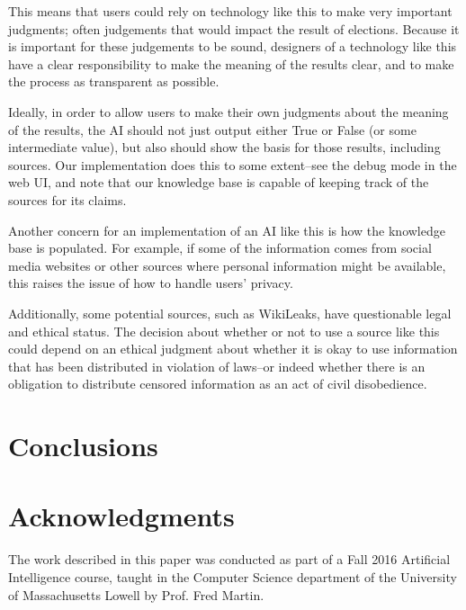 \documentclass{chi2009}
\begin{document}
This means that users could rely on technology like this to make very important judgments; often judgements that would impact the result of elections.
Because it is important for these judgements to be sound, designers of a technology like this have a clear responsibility to make the meaning of the results clear, and to make the process as transparent as possible.

Ideally, in order to allow users to make their own judgments about the meaning of the results, the AI should not just output either True or False (or some intermediate value), but also should show the basis for those results, including sources.
Our implementation does this to some extent--see the debug mode in the web UI, and note that our knowledge base is capable of keeping track of the sources for its claims.

Another concern for an implementation of an AI like this is how the knowledge base is populated.
For example, if some of the information comes from social media websites or other sources where personal information might be available, this raises the issue of how to handle users' privacy.

Additionally, some potential sources, such as WikiLeaks, have questionable legal and ethical status.
The decision about whether or not to use a source like this could depend on an ethical judgment about whether it is okay to use information that has been distributed in violation of laws--or indeed whether there is an obligation to distribute censored information as an act of civil disobedience.

\section{Conclusions}



\section{Acknowledgments}

The work described in this paper was conducted as part of a Fall 2016 Artificial Intelligence course, taught in the Computer Science department of the University of Massachusetts Lowell by Prof. Fred Martin.



\end{document}

